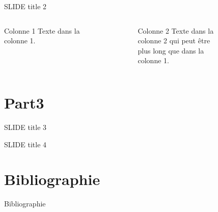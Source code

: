 \documentclass{beamer}
\newif\ifplacelogo %
\begin{document}
\begin{frame}{SLIDE title 2}
 
\begin{columns}[t]
  \begin{column}{5cm}
  \begin{block}{Colonne 1}
    Texte dans la\\
    colonne 1.
  \end{block} 
  \end{column}
  
  \begin{column}{5cm}
  \begin{block}{Colonne 2}
    Texte dans la\\
    colonne 2 qui peut être \cite{Zoran} \\
    plus long que dans la \\
    colonne 1.
  \end{block}   
  \end{column}
 \end{columns}  
\end{frame}
 

\section{Part3}


\begin{frame}{SLIDE title 3}
  
\end{frame}

\begin{frame}{SLIDE title 4}
  
\end{frame}


\section*{Bibliographie}

\begin{frame}{Bibliographie}

 
		
        
 
\end{frame}

\placelogofalse
 
\end{document}
